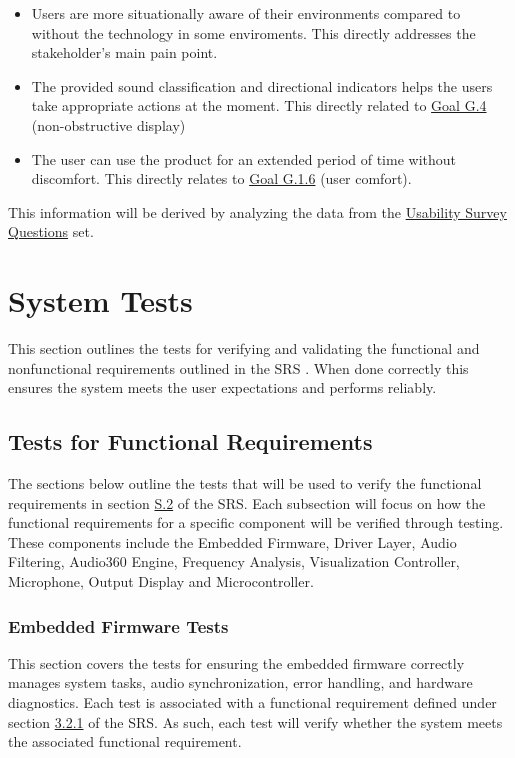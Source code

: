 \documentclass[12pt, titlepage]{article}
\begin{document}
\begin{itemize}
  \item Users are more situationally aware of their environments compared to
  without the technology in some enviroments. This directly addresses the
  stakeholder's main pain point.
  \item The provided sound classification and directional indicators helps the
  users take appropriate actions at the moment. This directly related to
  \hyperref[SRS-goal:visual_display]{Goal G.4} (non-obstructive display)
  \item The user can use the product for an extended period of time without
  discomfort. This directly relates to
  \hyperref[SRS-goal:user_comfort]{Goal G.1.6} (user comfort).
\end{itemize}


This information will be derived by analyzing the data from the 
\hyperref[sec:usability_survery_questions]{Usability Survey Questions} set.

\section{System Tests} \label{sec:system_tests}

This section outlines the tests for verifying and validating the functional and
nonfunctional requirements outlined in the SRS \cite{SRS}. When done correctly
this ensures the system meets the user expectations and performs reliably. 

\subsection{Tests for Functional Requirements}

The sections below outline the tests that will be used to verify the functional
requirements in section \hyperref[SRS-sec:S.2]{S.2} of the SRS. Each subsection
will focus on how the functional requirements for a specific component will be
verified through testing. These components include the Embedded Firmware, Driver
Layer, Audio Filtering, Audio360 Engine, Frequency Analysis, Visualization
Controller, Microphone, Output Display and Microcontroller. 

\subsubsection{Embedded Firmware Tests}

This section covers the tests for ensuring the embedded firmware correctly
manages system tasks, audio synchronization, error handling, and hardware
diagnostics. Each test is associated with a functional requirement defined under
section \hyperref[SRS-sec:FR1]{3.2.1} of the SRS. As such, each test will verify
whether the system meets the associated functional requirement.
\end{document}
